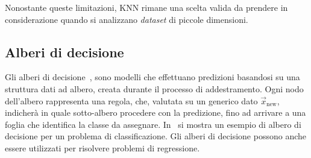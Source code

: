 Nonostante queste limitazioni, KNN rimane una scelta valida da prendere in considerazione quando si analizzano \emph{dataset} di piccole dimensioni.

\subsection{Alberi di decisione}
Gli alberi di decisione~\cite{decision_tree}, sono modelli che effettuano predizioni basandosi su una struttura dati ad albero, creata durante il processo di addestramento. 
Ogni nodo dell'albero rappresenta una regola, che, valutata su un generico dato $\Vec{x}_\text{new}$, indicherà in quale sotto-albero procedere con la predizione, fino ad arrivare a una foglia che identifica la classe da assegnare. 
In~ si mostra un esempio di albero di decisione per un problema di classificazione.
Gli alberi di decisione possono anche essere utilizzati per risolvere problemi di regressione.

